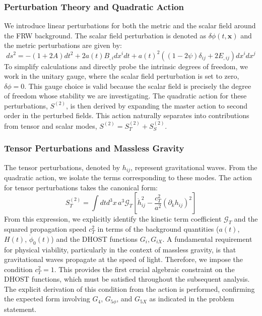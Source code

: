 \documentclass[twocolumn]{aastex631}
\begin{document}
\subsubsection{Perturbation Theory and Quadratic Action}
We introduce linear perturbations for both the metric and the scalar field around the FRW background. The scalar field perturbation is denoted as $\delta\phi(t, \mathbf{x})$ and the metric perturbations are given by:
$$ ds^2 = -(1+2A)dt^2 + 2a(t)B_{,i} dx^i dt + a(t)^2 ((1-2\psi)\delta_{ij} + 2E_{,ij}) dx^i dx^j $$
To simplify calculations and directly probe the intrinsic degrees of freedom, we work in the unitary gauge, where the scalar field perturbation is set to zero, $\delta\phi = 0$. This gauge choice is valid because the scalar field is precisely the degree of freedom whose stability we are investigating.
The quadratic action for these perturbations, $S^{(2)}$, is then derived by expanding the master action to second order in the perturbed fields. This action naturally separates into contributions from tensor and scalar modes, $S^{(2)} = S_T^{(2)} + S_S^{(2)}$.

\subsubsection{Tensor Perturbations and Massless Gravity}
The tensor perturbations, denoted by $h_{ij}$, represent gravitational waves. From the quadratic action, we isolate the terms corresponding to these modes. The action for tensor perturbations takes the canonical form:
$$ S_T^{(2)} = \int dt d^3x \, a^3 \mathcal{G}_T \left[ \dot{h}_{ij}^2 - \frac{c_T^2}{a^2} (\partial_k h_{ij})^2 \right] $$
From this expression, we explicitly identify the kinetic term coefficient $\mathcal{G}_T$ and the squared propagation speed $c_T^2$ in terms of the background quantities ($a(t)$, $H(t)$, $\dot{\phi}_0(t)$) and the DHOST functions $G_i, G_{iX}$. A fundamental requirement for physical viability, particularly in the context of massless gravity, is that gravitational waves propagate at the speed of light. Therefore, we impose the condition $c_T^2 = 1$. This provides the first crucial algebraic constraint on the DHOST functions, which must be satisfied throughout the subsequent analysis. The explicit derivation of this condition from the action is performed, confirming the expected form involving $G_4$, $G_{5\phi}$, and $G_{5X}$ as indicated in the problem statement.
\end{document}
